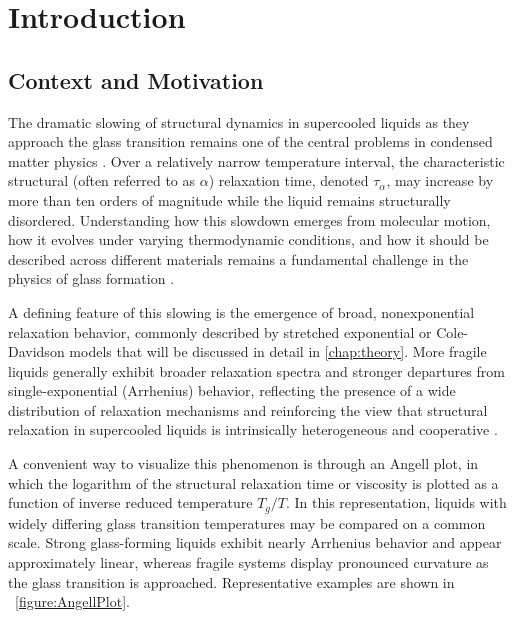 
\graphicspath{{Chapters/Introduction/Figures/}}

\chapter{Introduction}
\label{chap:NewIntroduction}

\section{Context and Motivation}

The dramatic slowing of structural dynamics in supercooled liquids as they approach the glass transition remains one of the central problems in condensed matter physics \cite{Ediger1996,Ediger2012}. Over a relatively narrow temperature interval, the characteristic structural (often referred to as $\alpha$) relaxation time, denoted $\tau_\alpha$, may increase by more than ten orders of magnitude while the liquid remains structurally disordered. Understanding how this slowdown emerges from molecular motion, how it evolves under varying thermodynamic conditions, and how it should be described across different materials remains a fundamental challenge in the physics of glass formation \cite{Berthier2011,Dyre2006}.

A defining feature of this slowing is the emergence of broad, nonexponential relaxation behavior, commonly described by stretched exponential or Cole-Davidson models that will be discussed in detail in \chap \ref{chap:theory}. More fragile liquids generally exhibit broader relaxation spectra and stronger departures from single-exponential (Arrhenius) behavior, reflecting the presence of a wide distribution of relaxation mechanisms and reinforcing the view that structural relaxation in supercooled liquids is intrinsically heterogeneous and cooperative \cite{Bohmer1993}. 

A convenient way to visualize this phenomenon is through an Angell plot, in which the logarithm of the structural relaxation time or viscosity is plotted as a function of inverse reduced temperature $T_g/T$. In this representation, liquids with widely differing glass transition temperatures may be compared on a common scale. Strong glass-forming liquids exhibit nearly Arrhenius behavior and appear approximately linear, whereas fragile systems display pronounced curvature as the glass transition is approached. Representative examples are shown in \fig~\ref{figure:AngellPlot}.

